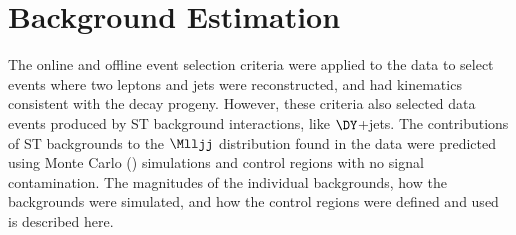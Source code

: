 \chapter{Background Estimation}
\label{sec:backgroundEstimation}
The online and offline event selection criteria were applied to the data to select events where two leptons and jets were 
reconstructed, and had kinematics consistent with the \WR decay progeny.  However, these criteria also selected data events 
produced by ST background interactions, like $\DY$+jets.  The contributions of ST backgrounds to the $\Mlljj$ distribution 
found in the data were predicted using Monte Carlo (\MC) simulations and control regions with no \WR signal contamination.  
The magnitudes of the individual backgrounds, how the backgrounds were simulated, and how the control regions were defined 
and used is described here.

